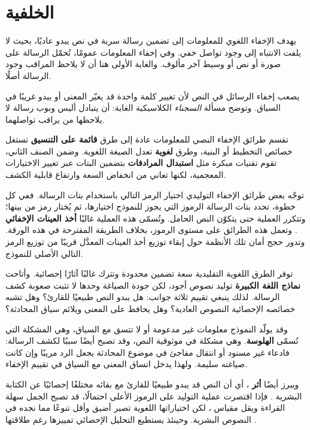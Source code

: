 \section{الخلفية}
\label{sec:background}

يهدف الإخفاء اللغوي للمعلومات إلى تضمين رسالة سرية في نص يبدو عاديًا، بحيث لا يلفت الانتباه إلى وجود تواصل خفي. وفي إخفاء المعلومات عمومًا، تُحمّل الرسالة على صورة أو نص أو وسيط آخر مألوف. والغاية الأولى هنا أن لا يلاحظ المراقب وجود الرسالة أصلًا.

يصعب إخفاء الرسائل في النص لأن تغيير كلمة واحدة قد يغيّر المعنى أو يبدو غريبًا في السياق. وتوضح مسألة \textit{السجناء} الكلاسيكية \cite{simmons1984prisoners} الغاية: أن يتبادل أليس وبوب رسالة لا يلاحظها من يراقب تواصلهما.

تقسم طرائق الإخفاء النصي للمعلومات عادة إلى طرق \textbf{قائمة على التنسيق} تستغل خصائص التخطيط أو البنية، وطرق \textbf{لغوية} تعدل الصيغة اللغوية. وضمن الصنف الثاني، تقوم تقنيات مبكرة مثل \textbf{استبدال المرادفات} بتضمين البتات عبر تغيير الاختيارات المعجمية، لكنها تعاني من انخفاض السعة وارتفاع قابلية الكشف.

توجّه بعض طرائق الإخفاء التوليدي اختيار الرمز التالي باستخدام بتات الرسالة.
ففي كل خطوة، تحدد بتات الرسالة الرموز التي يجوز للنموذج اختيارها، ثم يُختار رمز من بينها؛ وتتكرر العملية حتى يتكوّن النص الحامل.
وتُسمّى هذه العملية غالبًا \textbf{أخذ العينات الإخفائي} \cite{zhang2021provably}.
وتعمل هذه الطرائق على مستوى الرموز، بخلاف الطريقة المقترحة في هذه الورقة.
وتدور حجج أمان تلك الأنظمة حول إبقاء توزيع أخذ العينات المعدَّل قريبًا من توزيع الرمز التالي الأصلي للنموذج.

توفر الطرق اللغوية التقليدية سعة تضمين محدودة وتترك غالبًا آثارًا إحصائية. وأتاحت \textbf{نماذج اللغة الكبيرة} توليد نصوص أجود، لكن جودة الصياغة وحدها لا تثبت صعوبة كشف الرسالة. لذلك ينبغي تقييم ثلاثة جوانب: هل يبدو النص طبيعيًا للقارئ؟ وهل تشبه خصائصه الإحصائية النصوص العادية؟ وهل يحافظ على المعنى ويلائم سياق المحادثة؟ \cite{ding2023context}

وقد يولّد النموذج معلومات غير مدعومة أو لا تتسق مع السياق، وهي المشكلة التي تُسمّى \textbf{الهلوسة}. وهي مشكلة في موثوقية النص، وقد تصبح أيضًا سببًا لكشف الرسالة: فادعاء غير مسنود أو انتقال مفاجئ في موضوع المحادثة يجعل الرد مريبًا وإن كانت صياغته سليمة. ولهذا يدخل اتساق المعنى مع السياق في تقييم الإخفاء.

ويبرز أيضًا \textbf{أثر }، أي أن النص قد يبدو طبيعيًا للقارئ مع بقائه مختلفًا إحصائيًا عن الكتابة البشرية \cite{yang2020vae}. فإذا اقتصرت عملية التوليد على الرموز الأعلى احتمالًا، قد تصبح الجمل سهلة القراءة ويقل مقياس ، لكن اختياراتها اللغوية تصير أضيق وأقل تنوعًا مما نجده في النصوص البشرية. وحينئذ يستطيع التحليل الإحصائي تمييزها رغم طلاقتها \cite{yang2020vae}.

